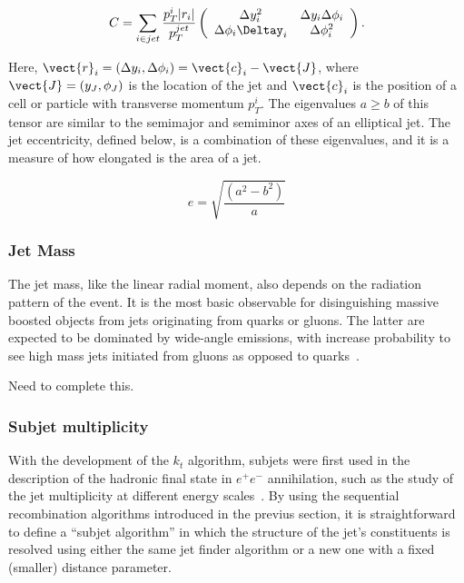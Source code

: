 \[ C = \sum_{i\in jet}\frac{p^i_T|r_i|}{p^{jet}_T} \left( \begin{array}{cc}
 \Delta y^2_i & \Delta y_i \Delta\phi_i \\ 
 \Delta\phi_i \Deltay_i & \Delta \phi^2_i \end{array} \right). \]


Here, $\vect{r}_i = (\Delta y_i, \Delta \phi_i) = \vect{c}_i - \vect{J}$, where $\vect{J} = (y_J,\phi_J)$ is the location of the jet and $\vect{c}_i$ is the position of a cell or particle with transverse momentum $p^i_T$. The eigenvalues $a \geq b$ of this tensor are similar to the semimajor and semiminor axes of an elliptical jet. The jet eccentricity, defined below, is a combination of these eigenvalues, and it is a measure of how elongated is the area of a jet.

\begin{equation} 
e = \sqrt{\frac{(a^2 - b^2)}{a}}
\label{eqn:ecc}
\end{equation}



\subsubsection{Jet Mass}


The jet mass, like the linear radial moment, also depends on the radiation pattern of the event. It is the most basic observable for disinguishing massive boosted objects from jets originating from quarks or gluons. The latter are expected to be dominated by wide-angle emissions, with increase probability to see high mass jets initiated from gluons as opposed to quarks~\cite{PhysRevD.79.074012}.  


{\sc Need to complete this}.






\subsubsection{Subjet multiplicity}

With the development of the $k_t$ algorithm, subjets were first used in the description of the hadronic final state in $e^+e^-$ annihilation, such as the study of the jet multiplicity at different energy scales~\cite{Catani1992445}. By using the sequential recombination algorithms introduced in the previus section, it is straightforward to define a ``subjet algorithm'' in which the structure of the jet's constituents is resolved using either the same jet finder algorithm or a new one with a fixed (smaller) distance parameter.


